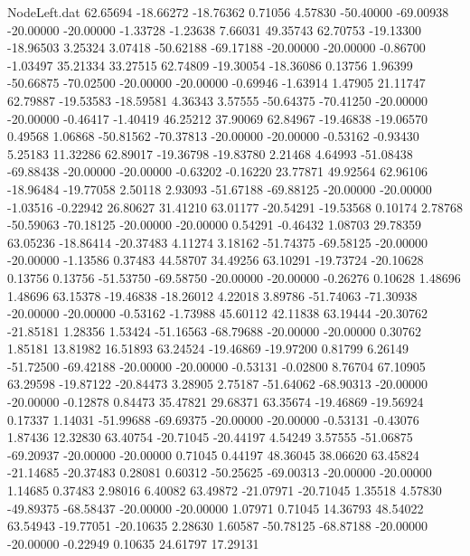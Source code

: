 \begin{filecontents}{NodeLeft.dat}
  62.65694  -18.66272  -18.76362     0.71056    4.57830  -50.40000  -69.00938  -20.00000  -20.00000   -1.33728   -1.23638    7.66031   49.35743
  62.70753  -19.13300  -18.96503     3.25324    3.07418  -50.62188  -69.17188  -20.00000  -20.00000   -0.86700   -1.03497   35.21334   33.27515
  62.74809  -19.30054  -18.36086     0.13756    1.96399  -50.66875  -70.02500  -20.00000  -20.00000   -0.69946   -1.63914    1.47905   21.11747
  62.79887  -19.53583  -18.59581     4.36343    3.57555  -50.64375  -70.41250  -20.00000  -20.00000   -0.46417   -1.40419   46.25212   37.90069
  62.84967  -19.46838  -19.06570     0.49568    1.06868  -50.81562  -70.37813  -20.00000  -20.00000   -0.53162   -0.93430    5.25183   11.32286
  62.89017  -19.36798  -19.83780     2.21468    4.64993  -51.08438  -69.88438  -20.00000  -20.00000   -0.63202   -0.16220   23.77871   49.92564
  62.96106  -18.96484  -19.77058     2.50118    2.93093  -51.67188  -69.88125  -20.00000  -20.00000   -1.03516   -0.22942   26.80627   31.41210
  63.01177  -20.54291  -19.53568     0.10174    2.78768  -50.59063  -70.18125  -20.00000  -20.00000    0.54291   -0.46432    1.08703   29.78359
  63.05236  -18.86414  -20.37483     4.11274    3.18162  -51.74375  -69.58125  -20.00000  -20.00000   -1.13586    0.37483   44.58707   34.49256
  63.10291  -19.73724  -20.10628     0.13756    0.13756  -51.53750  -69.58750  -20.00000  -20.00000   -0.26276    0.10628    1.48696    1.48696
  63.15378  -19.46838  -18.26012     4.22018    3.89786  -51.74063  -71.30938  -20.00000  -20.00000   -0.53162   -1.73988   45.60112   42.11838
  63.19444  -20.30762  -21.85181     1.28356    1.53424  -51.16563  -68.79688  -20.00000  -20.00000    0.30762    1.85181   13.81982   16.51893
  63.24524  -19.46869  -19.97200     0.81799    6.26149  -51.72500  -69.42188  -20.00000  -20.00000   -0.53131   -0.02800    8.76704   67.10905
  63.29598  -19.87122  -20.84473     3.28905    2.75187  -51.64062  -68.90313  -20.00000  -20.00000   -0.12878    0.84473   35.47821   29.68371
  63.35674  -19.46869  -19.56924     0.17337    1.14031  -51.99688  -69.69375  -20.00000  -20.00000   -0.53131   -0.43076    1.87436   12.32830
  63.40754  -20.71045  -20.44197     4.54249    3.57555  -51.06875  -69.20937  -20.00000  -20.00000    0.71045    0.44197   48.36045   38.06620
  63.45824  -21.14685  -20.37483     0.28081    0.60312  -50.25625  -69.00313  -20.00000  -20.00000    1.14685    0.37483    2.98016    6.40082
  63.49872  -21.07971  -20.71045     1.35518    4.57830  -49.89375  -68.58437  -20.00000  -20.00000    1.07971    0.71045   14.36793   48.54022
  63.54943  -19.77051  -20.10635     2.28630    1.60587  -50.78125  -68.87188  -20.00000  -20.00000   -0.22949    0.10635   24.61797   17.29131

\end{filecontents}
